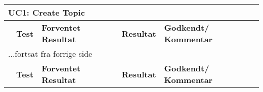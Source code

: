 \begin{center}
\begin{longtable}{|p{}|p{4.4cm}|p{4.4cm}|p{1.65cm}|p{}|}
\hline
\multicolumn{5}{|l|}{\textbf{UC1: Create Topic}} \\ \hline
\multicolumn{1}{|c|}{} &
\textbf{Test} &
\textbf{Forventet \newline Resultat} &
\textbf{Resultat} &
\textbf{Godkendt/ \newline Kommentar} \\ \hline 
\endfirsthead

\multicolumn{5}{l}{...fortsat fra forrige side} \\ \hline 
\multicolumn{1}{|c|}{} &
\textbf{Test} &
\textbf{Forventet \newline Resultat} &
\textbf{Resultat} &
\textbf{Godkendt/ \newline Kommentar} \\ \hline 
\endhead

%

\end{longtable}
	\label{table:auc:CreateTopic} 
\end{center}